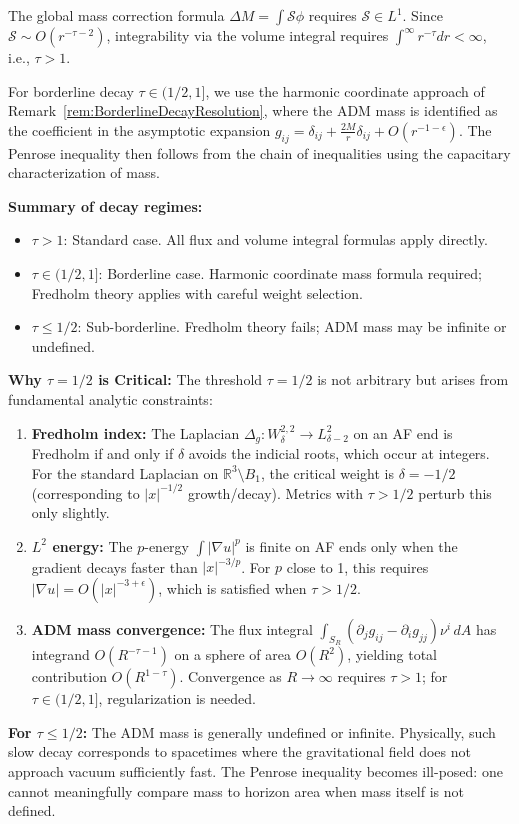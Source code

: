 \begin{remark}
The global mass correction formula $\Delta M = \int \mathcal{S} \phi$ requires $\mathcal{S} \in L^1$. Since $\mathcal{S} \sim O(r^{-\tau-2})$, integrability via the volume integral requires $\int^\infty r^{-\tau} dr < \infty$, i.e., $\tau > 1$.

For borderline decay $\tau \in (1/2, 1]$, we use the harmonic coordinate approach of Remark~\ref{rem:BorderlineDecayResolution}, where the ADM mass is identified as the coefficient in the asymptotic expansion $g_{ij} = \delta_{ij} + \frac{2M}{r}\delta_{ij} + O(r^{-1-\epsilon})$. The Penrose inequality then follows from the chain of inequalities using the capacitary characterization of mass.

\textbf{Summary of decay regimes:}
\begin{itemize}
    \item $\tau > 1$: Standard case. All flux and volume integral formulas apply directly.
    \item $\tau \in (1/2, 1]$: Borderline case. Harmonic coordinate mass formula required; Fredholm theory applies with careful weight selection.
    \item $\tau \le 1/2$: Sub-borderline. Fredholm theory fails; ADM mass may be infinite or undefined.
\end{itemize}

\textbf{Why $\tau = 1/2$ is Critical:} The threshold $\tau = 1/2$ is not arbitrary but arises from fundamental analytic constraints:
\begin{enumerate}
    \item \textbf{Fredholm index:} The Laplacian $\Delta_g: W^{2,2}_\delta \to L^2_{\delta-2}$ on an AF end is Fredholm if and only if $\delta$ avoids the indicial roots, which occur at integers. For the standard Laplacian on $\mathbb{R}^3 \setminus B_1$, the critical weight is $\delta = -1/2$ (corresponding to $|x|^{-1/2}$ growth/decay). Metrics with $\tau > 1/2$ perturb this only slightly.
    \item \textbf{$L^2$ energy:} The $p$-energy $\int |\nabla u|^p$ is finite on AF ends only when the gradient decays faster than $|x|^{-3/p}$. For $p$ close to 1, this requires $|\nabla u| = O(|x|^{-3+\epsilon})$, which is satisfied when $\tau > 1/2$.
    \item \textbf{ADM mass convergence:} The flux integral $\int_{S_R} (\partial_j g_{ij} - \partial_i g_{jj}) \nu^i \, dA$ has integrand $O(R^{-\tau-1})$ on a sphere of area $O(R^2)$, yielding total contribution $O(R^{1-\tau})$. Convergence as $R \to \infty$ requires $\tau > 1$; for $\tau \in (1/2, 1]$, regularization is needed.
\end{enumerate}

\textbf{For $\tau \le 1/2$:} The ADM mass is generally undefined or infinite. Physically, such slow decay corresponds to spacetimes where the gravitational field does not approach vacuum sufficiently fast. The Penrose inequality becomes ill-posed: one cannot meaningfully compare mass to horizon area when mass itself is not defined.
\end{remark}

